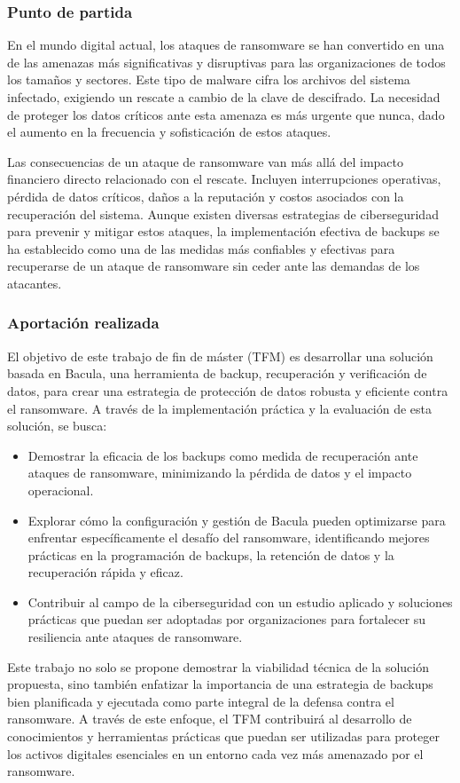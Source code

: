 \subsubsection{Punto de partida}
En el mundo digital actual, los ataques de ransomware se han convertido en una de las amenazas más significativas y disruptivas para las organizaciones de todos los tamaños y sectores. Este tipo de malware cifra los archivos del sistema infectado, exigiendo un rescate a cambio de la clave de descifrado. La necesidad de proteger los datos críticos ante esta amenaza es más urgente que nunca, dado el aumento en la frecuencia y sofisticación de estos ataques.

Las consecuencias de un ataque de ransomware van más allá del impacto financiero directo relacionado con el rescate. Incluyen interrupciones operativas, pérdida de datos críticos, daños a la reputación y costos asociados con la recuperación del sistema. Aunque existen diversas estrategias de ciberseguridad para prevenir y mitigar estos ataques, la implementación efectiva de backups se ha establecido como una de las medidas más confiables y efectivas para recuperarse de un ataque de ransomware sin ceder ante las demandas de los atacantes.


\subsubsection{Aportación realizada}
El objetivo de este trabajo de fin de máster (TFM) es desarrollar una solución basada en Bacula, una herramienta de backup, recuperación y verificación de datos, para crear una estrategia de protección de datos robusta y eficiente contra el ransomware. A través de la implementación práctica y la evaluación de esta solución, se busca:

\begin{itemize}
    \item Demostrar la eficacia de los backups como medida de recuperación ante ataques de ransomware, minimizando la pérdida de datos y el impacto operacional.
    \item Explorar cómo la configuración y gestión de Bacula pueden optimizarse para enfrentar específicamente el desafío del ransomware, identificando mejores prácticas en la programación de backups, la retención de datos y la recuperación rápida y eficaz.
    \item Contribuir al campo de la ciberseguridad con un estudio aplicado y soluciones prácticas que puedan ser adoptadas por organizaciones para fortalecer su resiliencia ante ataques de ransomware.
\end{itemize}

Este trabajo no solo se propone demostrar la viabilidad técnica de la solución propuesta, sino también enfatizar la importancia de una estrategia de backups bien planificada y ejecutada como parte integral de la defensa contra el ransomware. A través de este enfoque, el TFM contribuirá al desarrollo de conocimientos y herramientas prácticas que puedan ser utilizadas para proteger los activos digitales esenciales en un entorno cada vez más amenazado por el ransomware.